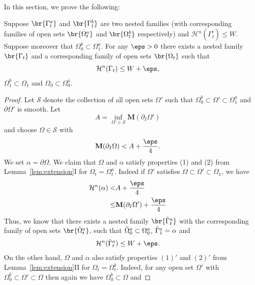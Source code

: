 In this section, we prove the following:
\begin{proposition}\label{prop:gluing-two-nested}
    Suppose $\br{\Gamma_t^a}$ and $\br{\Gamma_t^b}$ are two nested families (with corresponding families of open sets $\br{\Omega_t^a}$ and $\br{\Omega_t^b}$ respectively) and $\mathcal{H}^n(\Gamma_t^i) \leq W$. Suppose moreover that $\Omega_0^b \subset \Omega_1^a$. For any $\eps > 0$ there exists a nested family $\br{\Gamma_t}$ and a corresponding family of open sets $\br{\Omega_t}$ such that
    \begin{equation*}
        \mathcal{H}^n(\Gamma_t) \leq W + \eps,
    \end{equation*}
    $\Omega_1^b \subset \Omega_1$ and $\Omega_0 \subset \Omega_0^a$.
    \begin{proof}
        Let $\mathcal{S}$ denote the collection of all open sets $\Omega'$ such that $\Omega_0^b \subset \Omega' \subset \Omega_1^a$ and $\partial\Omega'$ is smooth. Let
        \begin{equation*}
            A = \inf_{\Omega'\in\mathcal{S}}\mathbf{M}(\partial_I\Omega')
        \end{equation*}
        and choose $\Omega\in \mathcal{S}$ with
        \begin{equation*}
            \mathbf{M}(\partial_I\Omega) < A + \frac{\eps}{4}.
        \end{equation*}
        We set $\alpha = \partial\Omega$. We claim that $\Omega$ and $\alpha$ satisfy properties (1) and (2) from Lemma~\ref{lem:extension}I for $\Omega_t = \Omega_t^a$. Indeed if $\Omega'$ satisfies $\Omega \subset \Omega' \subset \Omega_1$, we have
        \begin{equation*}
        \begin{split}
            \mathcal{H}^n(\alpha) <& A + \frac{\eps}{4}\\
            \leq& \mathbf{M}(\partial_I\Omega') + \frac{\eps}{4}
        \end{split}
        \end{equation*}
        Thus, we know that there exists a nested family $\br{\Tilde{\Gamma}_t^a}$ with the corresponding family of open sets $\br{\Tilde{\Omega}_t^a}$, such that $\Tilde{\Omega}_0^a \subset \Omega_0^a$, $\Tilde{\Gamma}_1^a = \alpha$ and
        \begin{equation*}
            \mathcal{H}^n(\Tilde{\Gamma}_t^a) \leq W + \eps.
        \end{equation*}
        On the other hand, $\Omega$ and $\alpha$ also satisfy properties $(1)'$ and $(2)'$ from Lemma~\ref{lem:extension}II for $\Omega_t = \Omega_t^b$. Indeed, for any open set $\Omega'$ with $\Omega_0^b \subset \Omega' \subset \Omega$ then again we have $\Omega_0^b \subset \Omega$ and

\end{proof}
\end{proposition}
